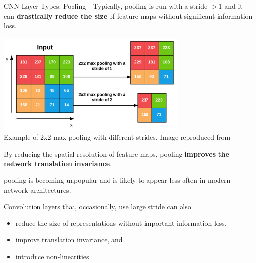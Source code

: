 \begin{frame}[t,allowframebreaks]{CNN Layer Types: Pooling -}
    Typically, \gls{pooling} is run with a 
    \gls{stride} $> 1$ and it can
    {\bf drastically reduce the size} of \glspl{feature map} 
    without significant information loss.\\

    \begin{center}
        \includegraphics[width=0.70\textwidth]
            {./images/cnn/pooling/rosebrock21_max_pooling_various_strides.png}\\
        \vspace{-0.5cm}
        {\scriptsize
            Example of 2x2 max pooling with different strides.
            \color{col:attribution} 
            Image reproduced from \cite{PyImageSearch:CNNLayerTypes}}\\    
    \end{center}

    \framebreak

    By reducing the spatial resolution of \glspl{feature map},
    \gls{pooling} 
    {\bf improves the network 
    translation invariance}.\\
    \vspace{0.2cm}

    \framebreak

    \Gls{pooling} is becoming unpopular and is likely to appear less often in modern 
    network architectures.\\
    \vspace{0.2cm}

    Convolution layers that, occasionally, use large stride can also 
    \begin{itemize}
        \item 
         reduce the size of representations without important information loss,
         \item 
         improve translation invariance, and
        \item 
         introduce non-linearities
    \end{itemize}
    \vspace{0.1cm}


\end{frame}
